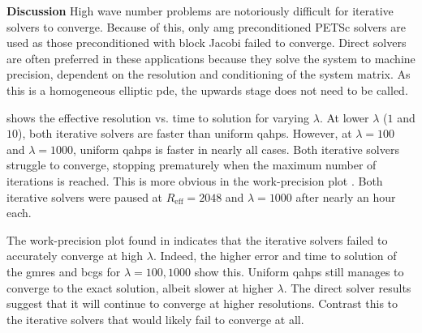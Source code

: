 {\bf Discussion}
High wave number problems are notoriously difficult for iterative solvers to converge. Because of this, only \gls{amg} preconditioned PETSc solvers are used as those preconditioned with block Jacobi failed to converge. Direct solvers are often preferred in these applications because they solve the system to machine precision, dependent on the resolution and conditioning of the system matrix. As this is a homogeneous elliptic \gls{pde}, the upwards stage does not need to be called.

 shows the effective resolution vs. time to solution for varying $\lambda$. At lower $\lambda$ ($1$ and $10$), both iterative solvers are faster than uniform \gls{qahps}. However, at $\lambda = 100$ and $\lambda = 1000$, uniform \gls{qahps} is faster in nearly all cases. Both iterative solvers struggle to converge, stopping prematurely when the maximum number of iterations is reached. This is more obvious in the work-precision plot . Both iterative solvers were paused at $R_{\text{eff}} = 2048$ and $\lambda = 1000$ after nearly an hour each.

The work-precision plot found in  indicates that the iterative solvers failed to accurately converge at high $\lambda$. Indeed, the higher error and time to solution of the \gls{gmres} and \gls{bcgs} for $\lambda = 100, 1000$ show this. Uniform \gls{qahps} still manages to converge to the exact solution, albeit slower at higher $\lambda$. The direct solver results suggest that it will continue to converge at higher resolutions. Contrast this to the iterative solvers that would likely fail to converge at all.